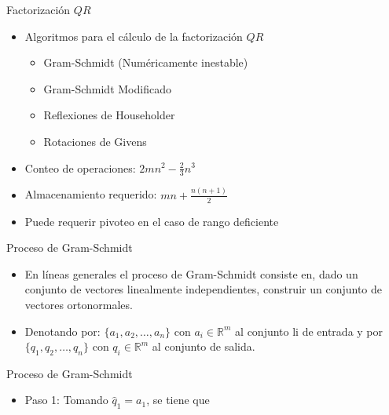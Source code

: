 \documentclass{beamer}
\begin{document}
\begin{frame}{Factorizaci\'on $QR$}
  \begin{itemize}
   \item Algoritmos para el c\'alculo  de la factorizaci\'on $QR$
   \begin{itemize}
    \item<2-> Gram-Schmidt (Num\'ericamente inestable)
    \item<3-> Gram-Schmidt Modificado
    \item<4-> Reflexiones de Householder
    \item<5-> Rotaciones de Givens
   \end{itemize}
   \item<6-> Conteo de operaciones: $2mn^2-\frac{2}{3}n^3$
   \item<7-> Almacenamiento requerido: $mn+\frac{n(n+1)}{2}$
   \item<8-> Puede requerir pivoteo en el caso de rango deficiente
  \end{itemize}
 \end{frame}
 \begin{frame}{Proceso de Gram-Schmidt}
 \begin{itemize}
  \item En l\'ineas generales el proceso de Gram-Schmidt consiste en, dado un conjunto de vectores linealmente independientes, construir un conjunto de vectores ortonormales.
  \item<2-> Denotando por: $\{a_1,a_2,\ldots,a_n\}$ con $a_i \in \mathbb{R}^{m}$ al conjunto li de entrada y por $\{q_1,q_2,\ldots,q_n\}$ con $q_i \in \mathbb{R}^{m}$ al conjunto de salida.
  \end{itemize}
 \end{frame}
 \begin{frame}{Proceso de Gram-Schmidt}
  \begin{itemize}
   \item Paso 1: Tomando $\hat q_1= a_1$, se tiene que 
  \end{itemize}
 \end{frame}
\end{document}
